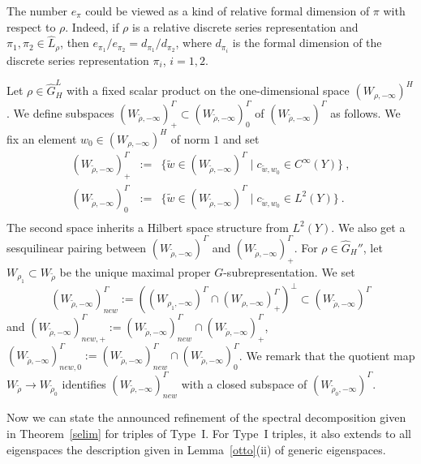\documentclass[10]{amsart}
\theoremstyle{remark}
\theoremstyle{definition}
\numberwithin{equation}{section}
\begin{document}
{The number $e_\pi$ could be viewed as a kind of relative formal dimension of $\pi$ with respect to $\rho$. Indeed, if $\rho$ is a relative discrete series representation and $\pi_1,\pi_2\in\widehat L_\rho$, then $e_{\pi_1}/e_{\pi_2}=d_{\pi_1}/d_{\pi_2}$, where $d_{\pi_i}$ is the formal dimension of the discrete series representation $\pi_i$, $i=1,2$.

Let $\rho\in\widehat G^L _H$ with a fixed scalar product on the one-dimensional space $(W_{\rho,-\infty})^H$. We define subspaces $(W_{\tilde \rho,-\infty})_+^\Gamma\subset (W_{\tilde \rho,-\infty})^\Gamma_0$ of $(W_{\tilde \rho,-\infty})^\Gamma$
as follows. We fix an element $w_0\in (W_{\rho,-\infty})^H$ of norm $1$ and set 
\begin{eqnarray*}
(W_{\tilde \rho,-\infty})_+^\Gamma&:=&\{\tilde w\in (W_{\tilde \rho,-\infty})^\Gamma\mid c_{\tilde w,w_0}\in C^\infty(Y)\}\ ,\\
(W_{\tilde \rho,-\infty})_0^\Gamma&:=&\{\tilde w\in (W_{\tilde \rho,-\infty})^\Gamma\mid c_{\tilde w,w_0}\in L^2(Y)\}\ .\\
\end{eqnarray*}
The second space inherits a Hilbert space structure from $L^2(Y)$. We also get a sesquilinear pairing between $(W_{\tilde \rho,-\infty})^\Gamma$ and $(W_{\tilde \rho,-\infty})_+^\Gamma$. For $\rho\in \widehat G_H''$, let $W_{\rho_1}\subset W_{\tilde\rho}$ be the unique maximal proper $G$-subrepresentation. We  set
$$    (W_{\tilde \rho,-\infty})^\Gamma_{new}:=\left ( (W_{\rho_1,-\infty})^\Gamma\cap  (W_{\rho,-\infty})^\Gamma_+\right )^\perp \subset (W_{\tilde \rho,-\infty})^\Gamma$$
and   $(W_{\tilde \rho,-\infty})^\Gamma_{new,+}:= (W_{\tilde \rho,-\infty})^\Gamma_{new}\cap (W_{\tilde \rho,-\infty})^\Gamma_{+}$,
$(W_{\tilde \rho,-\infty})^\Gamma_{new,0}:= (W_{\tilde \rho,-\infty})^\Gamma_{new}\cap (W_{\tilde \rho,-\infty})^\Gamma_{0}$.
We remark that the quotient map $W_{\tilde\rho}\rightarrow W_{\tilde\rho_0}$ identifies $(W_{\tilde \rho,-\infty})^\Gamma_{new}$ with a closed subspace of
$(W_{\tilde \rho_0,-\infty})^\Gamma$. 

Now we can state the announced refinement of the spectral decomposition given in Theorem~\ref{selim} for triples of Type~I. For Type~I triples, it also extends to all eigenspaces the description given in Lemma~\ref{otto}(ii) of generic eigenspaces.

}
\end{document}
